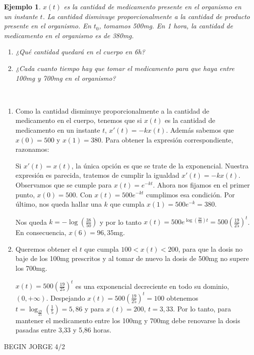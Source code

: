 \documentclass{article}
\makeatletter
\theoremstyle{theorem-style}  %
\theoremstyle{definition-style}
\theoremstyle{example-style}
\newtheorem{example}{Ejemplo}[section]
\renewenvironment{proof}[1][\proofname]{\par
	\pushQED{\qed}%
	\normalfont \topsep6\p@\@plus6\p@\relax
	\list{}{%
		\settowidth{\leftmargin}{\quad:\hskip\labelsep}%
		\setlength{\labelwidth}{0pt}%
		\setlength{\itemindent}{-\leftmargin}%
	}%
	\item[\hskip\labelsep\itshape#1\@addpunct{:}]\ignorespaces
}{%
	\popQED\endlist\@endpefalse
}
\makeatother
\begin{document}
\begin{example}
	$ x(t) $ es la cantidad de medicamento presente en el organismo en un instante $ t $. La cantidad disminuye proporcionalmente a la cantidad de producto presente en el organismo. En $ t_0 $, tomamos 500mg. En 1 hora, la cantidad de medicamento en el organismo es de 380mg.
	\begin{enumerate}[\qquad a)]
		\item ¿Qué cantidad quedará en el cuerpo en 6h?
		\item ¿Cada cuanto tiempo hay que tomar el medicamento para que haya entre 100mg y 700mg en el organismo? 
	\end{enumerate}
\end{example}
\begin{proof}[Solución] \ 
	\begin{enumerate}[\qquad a)]
		\item Como la cantidad disminuye proporcionalmente a la cantidad de medicamento en el cuerpo, tenemos que si $ x(t) $ es la cantidad de medicamento en un instante $ t $, $ x'(t)=-kx(t) $. Además sabemos que $ x(0)=500 $ y $ x(1)=380 $. Para obtener la expresión correspondiente, razonamos:

		Si $ x'(t)=x(t) $, la única opción es que se trate de la exponencial. Nuestra expresión es parecida, tratemos de cumplir la igualdad $ x'(t)=-kx(t) $. Observamos que se cumple para $ x(t)=e^{-kt} $. Ahora nos fijamos en el primer punto,  $ x(0)=500 $. Con  $ x(t)=500e^{-kt} $ cumplimos esa condición. Por último, nos queda hallar una $ k $ que cumpla $ x(1)=500e^{-k}=380 $. 
		
		Nos queda $ k=-\log(\frac{38}{50}) $ y por lo tanto $ x(t)=500e^{\log(\frac{38}{50})t} =500(\frac{19}{25})^t$. En consecuencia, $ x(6)=96,35 $mg.

		\item Queremos obtener el $ t $ que cumpla $ 100<x(t)<200 $, para que la dosis no baje de los 100mg prescritos y al tomar de nuevo la dosis de 500mg no supere los 700mg.

		$ x(t)=500(\frac{19}{25})^t$ es una exponencial decreciente en todo su dominio, $ (0, +\infty) $. Despejando $ x(t)=500(\frac{19}{25})^t=100$ obtenemos $ t=\log_{\frac{19}{25}}(\frac{1}{5})=5,86 $ y para $ x(t)=200 $, $ t=3,33 $. Por lo tanto, para mantener el medicamento entre los 100mg y 700mg debe renovarse la dosis pasadas entre 3,33 y 5,86 horas.
	\end{enumerate}
\end{proof}
BEGIN JORGE 4/2
\end{document}
